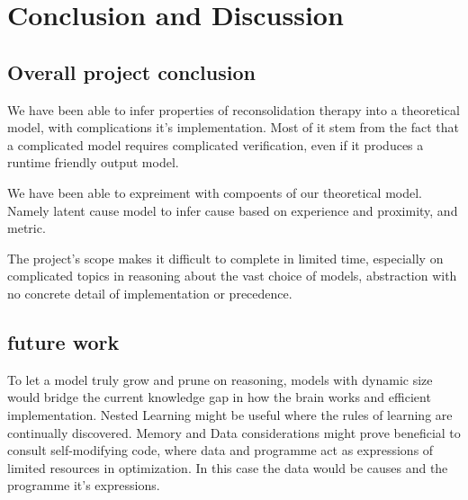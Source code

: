 \documentclass{surreydissertation}
\begin{document}

\chapter{Conclusion and Discussion}
\section{Overall project conclusion}
We have been able to infer properties of reconsolidation therapy into a theoretical model, with complications it's implementation. Most of it stem from the fact that a complicated model requires complicated verification, even if it produces a runtime friendly output model.

We have been able to expreiment with compoents of our theoretical model. Namely latent cause model to infer cause based on experience and proximity, and metric.

The project's scope makes it difficult to complete in limited time, especially on complicated topics in reasoning about the vast choice of models, abstraction with no concrete detail of implementation or precedence. 

\section{future work}
To let a model truly grow and prune on reasoning, models with dynamic size would bridge the current knowledge gap in how the brain works and efficient implementation.
Nested Learning \cite{behrouz2025nested} might be useful where the rules of learning are continually discovered.
Memory and Data considerations might prove beneficial to consult self-modifying code, where data and programme act as expressions of limited resources in optimization. In this case the data would be causes and the programme it's expressions.



\end{document}
